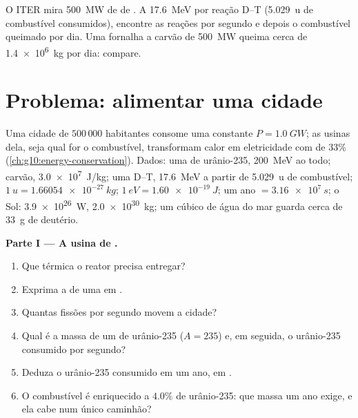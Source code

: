 \begin{exercise}[$\star\star\star$]\label{exo:g12:nuclear-energy:15}
O ITER mira \qty{500}{MW} de  de . A \qty{17.6}{MeV} por reação D--T
(\qty{5.029}{u} de combustível consumidos), encontre as reações por segundo e depois o
combustível queimado por dia. Uma fornalha a carvão de \qty{500}{MW} queima cerca de
\qty{1.4e6}{kg} por dia: compare.
\end{exercise}

\section{Problema: alimentar uma cidade}

\begin{problem}
\label{pb:g12:nuclear-energy:1}
Uma cidade de $500\,000$ habitantes consome uma  constante
$P = \qty{1.0}{GW}$; as usinas dela, seja qual for o combustível, transformam calor em
eletricidade com  de $33\%$ (\cref{ch:g10:energy-conservation}). Dados: uma
 de urânio-235, \qty{200}{MeV} ao todo; carvão, \qty{3.0e7}{J/kg}; uma 
D--T, \qty{17.6}{MeV} a partir de \qty{5.029}{u} de combustível;
$\qty{1}{u} = \qty{1.66054e-27}{kg}$; $\qty{1}{eV} = \qty{1.60e-19}{J}$; um ano
$= \qty{3.16e7}{s}$; o Sol: \qty{3.9e26}{W}, \qty{2.0e30}{kg}; um  cúbico de água do
mar guarda cerca de \qty{33}{g} de deutério.

\medskip
\noindent\textbf{Parte I --- A usina de .}
\begin{enumerate}
  \item Que  térmica o reator precisa entregar?
  \item Exprima a  de uma  em .
  \item Quantas fissões por segundo movem a cidade?
  \item Qual é a massa de um  de urânio-235 ($A = 235$) e, em seguida, o
        urânio-235 consumido por segundo?
  \item Deduza o urânio-235 consumido em um ano, em .
  \item O combustível é enriquecido a $4.0\%$ de urânio-235: que massa um ano exige, e
        ela cabe num único caminhão?
\end{enumerate}


\end{problem}
